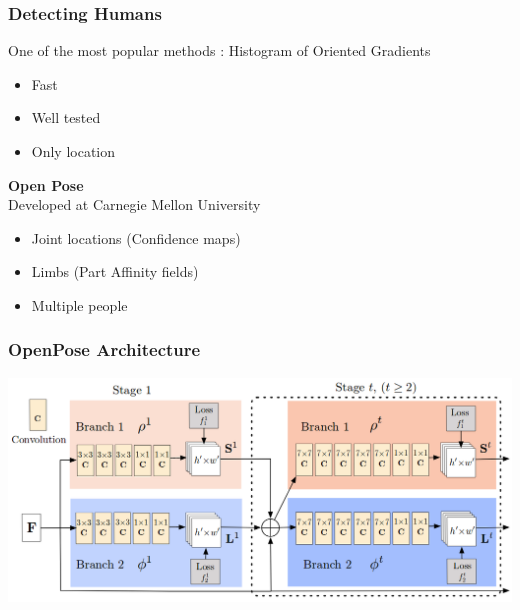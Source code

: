 \documentclass[xcolor=pdftex,dvipsnames,table]{beamer}
\begin{document}
\begin{frame}
  \frametitle{Detecting Humans \\ }

    One of the most popular methods : \pause Histogram of Oriented Gradients \pause
    \begin{itemize}
    \item Fast \pause
    \item Well tested \pause
    \item Only location \pause
    \end{itemize}
    \vspace{20pt}
    
    {\Large \textbf{Open Pose}}\pause \\

    Developed at Carnegie Mellon University \pause
    \begin{itemize}
    \item Joint locations (Confidence maps) \pause
    \item Limbs (Part Affinity fields) \pause
    \item Multiple people 
    \end{itemize}
    
\end{frame}

\begin{frame}
  \frametitle{OpenPose Architecture \\ }
    \includegraphics[width=\linewidth]{graphics/openposeArch}
\end{frame}
\end{document}

